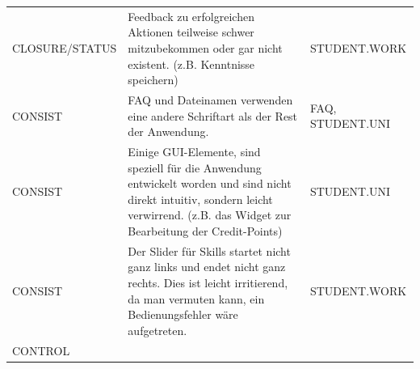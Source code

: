 \documentclass[
  12pt,
  ngerman,
  a4paper,
]{article}
\begin{document}
\begin{longtable}[]{@{}lll@{}}
\begin{minipage}[t]{0.22\columnwidth}
CLOSURE/STATUS\strut
\end{minipage} & \begin{minipage}[t]{0.52\columnwidth}\raggedright
Feedback zu erfolgreichen Aktionen teilweise schwer mitzubekommen oder
gar nicht existent. (z.B. Kenntnisse speichern)\strut
\end{minipage} & \begin{minipage}[t]{0.17\columnwidth}\raggedright
STUDENT.WORK\strut
\end{minipage}\tabularnewline
\begin{minipage}[t]{0.22\columnwidth}\raggedright
CONSIST\strut
\end{minipage} & \begin{minipage}[t]{0.52\columnwidth}\raggedright
FAQ und Dateinamen verwenden eine andere Schriftart als der Rest der
Anwendung.\strut
\end{minipage} & \begin{minipage}[t]{0.17\columnwidth}\raggedright
FAQ, STUDENT.UNI\strut
\end{minipage}\tabularnewline
\begin{minipage}[t]{0.22\columnwidth}\raggedright
CONSIST\strut
\end{minipage} & \begin{minipage}[t]{0.52\columnwidth}\raggedright
Einige GUI-Elemente, sind speziell für die Anwendung entwickelt worden
und sind nicht direkt intuitiv, sondern leicht verwirrend. (z.B. das
Widget zur Bearbeitung der Credit-Points)\strut
\end{minipage} & \begin{minipage}[t]{0.17\columnwidth}\raggedright
STUDENT.UNI\strut
\end{minipage}\tabularnewline
\begin{minipage}[t]{0.22\columnwidth}\raggedright
CONSIST\strut
\end{minipage} & \begin{minipage}[t]{0.52\columnwidth}\raggedright
Der Slider für Skills startet nicht ganz links und endet nicht ganz
rechts. Dies ist leicht irritierend, da man vermuten kann, ein
Bedienungsfehler wäre aufgetreten.\strut
\end{minipage} & \begin{minipage}[t]{0.17\columnwidth}\raggedright
STUDENT.WORK\strut
\end{minipage}\tabularnewline
\begin{minipage}[t]{0.22\columnwidth}\raggedright
CONTROL\strut
\end{minipage} & \begin{minipage}[t]{0.52\columnwidth}\raggedright

\end{minipage}
\end{longtable}
\end{document}
